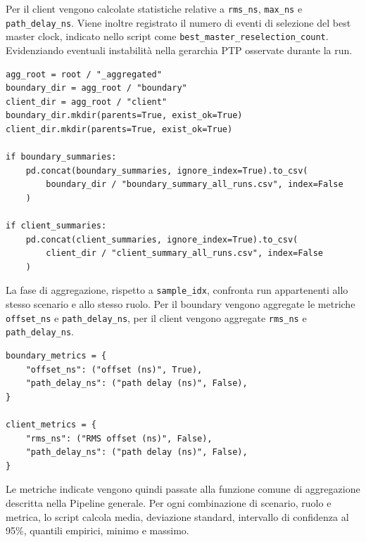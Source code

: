 \begin{sloppypar}
  Per il client vengono calcolate statistiche relative a \texttt{rms\_ns},
  \texttt{max\_ns} e \texttt{path\_delay\_ns}. Viene inoltre registrato il numero
  di eventi di selezione del best master clock, indicato nello script come
  \texttt{best\_master\_reselection\_count}. Evidenziando eventuali instabilità 
  nella gerarchia PTP osservate durante la run.
\end{sloppypar}

\begin{listing}[H]
\begin{verbatim}
agg_root = root / "_aggregated"
boundary_dir = agg_root / "boundary"
client_dir = agg_root / "client"
boundary_dir.mkdir(parents=True, exist_ok=True)
client_dir.mkdir(parents=True, exist_ok=True)

if boundary_summaries:
    pd.concat(boundary_summaries, ignore_index=True).to_csv(
        boundary_dir / "boundary_summary_all_runs.csv", index=False
    )

if client_summaries:
    pd.concat(client_summaries, ignore_index=True).to_csv(
        client_dir / "client_summary_all_runs.csv", index=False
    )
\end{verbatim}
\caption{Salvataggio dei riepiloghi per-run per boundary e client PTP.}
\label{lst:ptp-summary-output}
\end{listing}

La fase di aggregazione, rispetto a \texttt{sample\_idx}, confronta run 
appartenenti allo stesso scenario e allo stesso ruolo. Per il boundary 
vengono aggregate le metriche \texttt{offset\_ns} e \texttt{path\_delay\_ns}, 
per il client vengono aggregate \texttt{rms\_ns} e \texttt{path\_delay\_ns}.

\begin{listing}[H]
\begin{verbatim}
boundary_metrics = {
    "offset_ns": ("offset (ns)", True),
    "path_delay_ns": ("path delay (ns)", False),
}

client_metrics = {
    "rms_ns": ("RMS offset (ns)", False),
    "path_delay_ns": ("path delay (ns)", False),
}
\end{verbatim}
\caption{Metriche PTP aggregate per boundary clock e client.}
\label{lst:ptp-metric-specs}
\end{listing}
Le metriche indicate vengono quindi passate alla funzione comune di aggregazione
descritta nella Pipeline generale. Per ogni combinazione di scenario, ruolo e
metrica, lo script calcola media, deviazione standard, intervallo di confidenza
al 95\%, quantili empirici, minimo e massimo.

